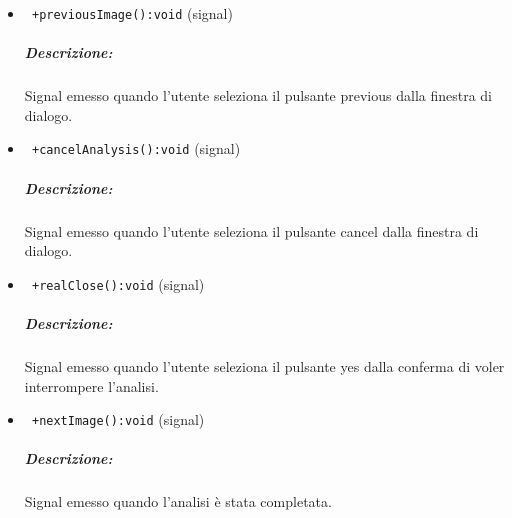 \begin{itemize}
\item \color{blue}\verb! +previousImage():void! (signal)
\color{black}
\subparagraph{Descrizione:} Signal\g{} emesso quando l'utente seleziona il pulsante previous dalla finestra di dialogo.

\item \color{blue}\verb! +cancelAnalysis():void! (signal)
\color{black}
\subparagraph{Descrizione:} Signal\g{} emesso quando l'utente seleziona il pulsante cancel dalla finestra di dialogo.

\item \color{blue}\verb! +realClose():void! (signal)
\color{black}
\subparagraph{Descrizione:} Signal\g{} emesso quando l'utente seleziona il pulsante yes dalla conferma di voler interrompere l'analisi.

\item \color{blue}\verb! +nextImage():void! (signal)
\color{black}
\subparagraph{Descrizione:} Signal\g{} emesso quando l'analisi è stata completata.

\end{itemize}
\color{black}
\pagebreak